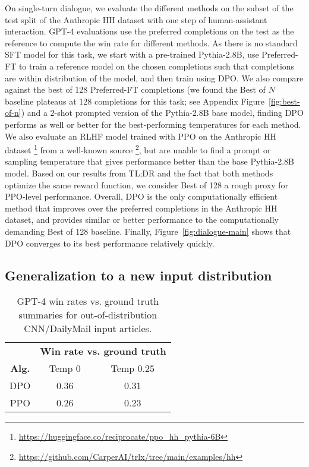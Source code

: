 On single-turn dialogue, we evaluate the different methods on the subset of the test split of the Anthropic HH dataset \citep{bai2022training} with one step of human-assistant interaction. GPT-4 evaluations use the preferred completions on the test as the reference to compute the win rate for different methods. As there is no standard SFT model for this task, we start with a pre-trained Pythia-2.8B, use Preferred-FT to train a reference model on the chosen completions such that completions are within distribution of the model, and then train using DPO. We also compare against the best of 128 Preferred-FT completions (we found the Best of $N$ baseline plateaus at 128 completions for this task; see Appendix Figure~\ref{fig:best-of-n}) and a 2-shot prompted version of the Pythia-2.8B base model, finding DPO performs as well or better for the best-performing temperatures for each method. We also evaluate an RLHF model trained with PPO on the Anthropic HH dataset \footnote{\url{https://huggingface.co/reciprocate/ppo_hh_pythia-6B}} from a well-known source \footnote{\url{https://github.com/CarperAI/trlx/tree/main/examples/hh}}, but are unable to find a prompt or sampling temperature that gives performance better than the base Pythia-2.8B model. Based on our results from TL;DR and the fact that both methods optimize the same reward function, we consider Best of 128 a rough proxy for PPO-level performance. Overall, DPO is the only computationally efficient method that improves over the preferred completions in the Anthropic HH dataset, and provides similar or better performance to the computationally demanding Best of 128 baseline. Finally, Figure~\ref{fig:dialogue-main} shows that DPO converges to its best performance relatively quickly.

\subsection{Generalization to a new input distribution}

\begin{wraptable}{r}{0.375\textwidth}
    \small
    \vspace{-10mm}
    \begin{tabular}{ccc}
        \toprule
        & \multicolumn{2}{c}{\textbf{Win rate vs. ground truth}} \\
        \cmidrule(lr){2-3}
        \textbf{Alg.} & Temp $0$ & Temp $0.25$ \\
        \midrule
        DPO & 0.36 & 0.31 \\
        PPO & 0.26 & 0.23 \\
        \bottomrule
    \end{tabular}
    \caption{GPT-4 win rates vs. ground truth summaries for out-of-distribution CNN/DailyMail input articles.}
    \vspace{-3mm}
    \label{tab:ood}
\end{wraptable}

